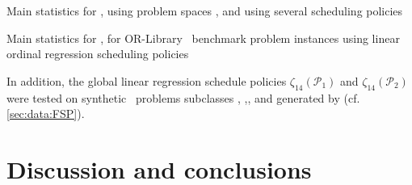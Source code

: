 \begin{table}\centering
\caption{Main statistics for \namerho, using problem spaces ,  and  using several scheduling policies}\label{tbl:comp:p1p2p3:summary}
%
\end{table}


%
\clearpage
\begin{table}\centering
\caption{Main statistics for \namerho, for OR-Library \jsp\ benchmark problem instances using linear ordinal regression scheduling policies}\label{tbl:comp:orlibjssp:summary}
%
\end{table}

In addition, the global linear regression schedule policies $\zeta_{14}(\mathcal{P}_1)$ and $\zeta_{14}(\mathcal{P}_2)$ were tested on synthetic \FSP\ problems subclasses , ,,  and  generated by \citet{Whitley} (cf. \cref{sec:data:FSP}). 

% 
%



\section{Discussion and conclusions}